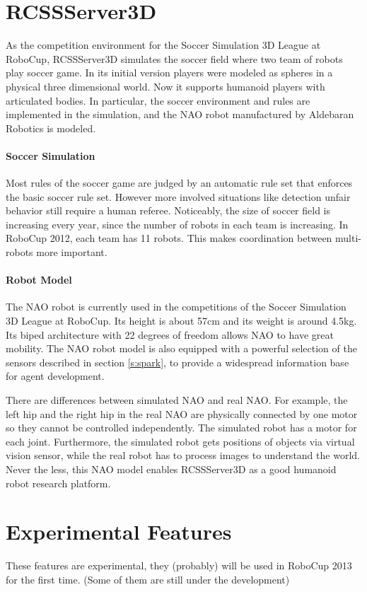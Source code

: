 \documentclass{llncs}
\begin{document}
\section{RCSSServer3D}
\label{s:rcssserver3d}

As the competition environment for the Soccer Simulation 3D League at RoboCup, 
RCSSServer3D simulates the soccer field where two team of robots play soccer game.
In its initial version players were modeled as spheres in a physical three dimensional world. Now it supports humanoid players with articulated bodies. In particular,  the soccer environment and rules are implemented in the simulation, and the NAO robot manufactured by Aldebaran Robotics is modeled.

\paragraph{Soccer Simulation}
Most rules of the soccer game are judged by an automatic rule set that enforces the basic soccer rule set.
However more involved situations like detection unfair behavior still require a human referee.
Noticeably, the size of soccer field is increasing every year, since the number of robots in each team is increasing. In RoboCup 2012, each team has 11 robots.
This makes coordination between multi-robots more important.

\paragraph{Robot Model}
The NAO robot is currently used in the competitions of the Soccer Simulation 3D League at RoboCup. Its height is about 57cm and its weight is around 4.5kg.
Its biped architecture with 22 degrees of freedom allows NAO to have great mobility.
The NAO robot model is also equipped with a powerful selection of the
sensors described in section \ref{s:spark}, to provide a widespread information base for
agent development.

There are differences between simulated NAO and real NAO. For example, the left hip and the right hip in the real NAO are physically connected by one motor so they cannot be controlled independently. The simulated robot has a motor for each joint. Furthermore, the simulated robot gets positions of objects via virtual vision sensor, while the real robot has to process images to understand the world. Never the less, this NAO model enables RCSSServer3D as a good humanoid robot research platform.


\section{Experimental Features}
\label{s:ongoing}
These features are experimental, they (probably) will be used in RoboCup 2013 for the first time. (Some of them are still under the development)
\end{document}
